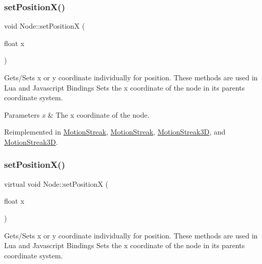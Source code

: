 \subsubsection{\texorpdfstring{set\+Position\+X()}{setPositionX()}\hspace{0.1cm}{\footnotesize\ttfamily [1/2]}}
{\footnotesize\ttfamily void Node\+::set\+PositionX (\begin{DoxyParamCaption}\item[{float}]{x }\end{DoxyParamCaption})\hspace{0.3cm}{\ttfamily [virtual]}}

Gets/\+Sets x or y coordinate individually for position. These methods are used in Lua and Javascript Bindings Sets the x coordinate of the node in its parent\textquotesingle{}s coordinate system.


\begin{DoxyParams}{Parameters}
{\em x} & The x coordinate of the node. \\
\hline
\end{DoxyParams}


Reimplemented in \hyperlink{classMotionStreak_af6cb7fe8388e16af000893b75c9676a0}{Motion\+Streak}, \hyperlink{classMotionStreak_aabc8d8fedcddd0f9e1e77b090ce8f7ed}{Motion\+Streak}, \hyperlink{classMotionStreak3D_a1b723a27b44aa12ced168fe18ca920de}{Motion\+Streak3D}, and \hyperlink{classMotionStreak3D_a9c363f74a20d8b5e83357343ecfad7d4}{Motion\+Streak3D}.

\mbox{\label{classNode_a2b26ff930ebb0b241bc40b7f573be417}} 
\subsubsection{\texorpdfstring{set\+Position\+X()}{setPositionX()}\hspace{0.1cm}{\footnotesize\ttfamily [2/2]}}
{\footnotesize\ttfamily virtual void Node\+::set\+PositionX (\begin{DoxyParamCaption}\item[{float}]{x }\end{DoxyParamCaption})\hspace{0.3cm}{\ttfamily [virtual]}}

Gets/\+Sets x or y coordinate individually for position. These methods are used in Lua and Javascript Bindings Sets the x coordinate of the node in its parent\textquotesingle{}s coordinate system.


